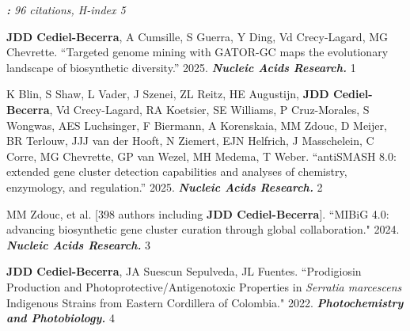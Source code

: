 
\textit{\textbf{:} 96 citations, H-index 5}

 \vspace{-2mm}

\begin{cvpubs}

\cvpub
{\textbf{JDD Cediel-Becerra}, A Cumsille, S Guerra, Y Ding, Vd Crecy-Lagard, MG Chevrette. ``Targeted genome mining with GATOR-GC maps the evolutionary landscape of biosynthetic diversity.'' 2025. \textit{\textbf{Nucleic Acids Research.}} \textit{\textbf{}}}
{1}

\cvpub
{K Blin, S Shaw, L Vader, J Szenei, ZL Reitz, HE Augustijn, \textbf{JDD Cediel-Becerra}, Vd Crecy-Lagard, RA Koetsier, SE Williams, P Cruz-Morales, S Wongwas, AES Luchsinger, F Biermann, A Korenskaia, MM Zdouc, D Meijer, BR Terlouw, JJJ van der Hooft, N Ziemert, EJN Helfrich, J Masschelein, C Corre, MG Chevrette, GP van Wezel, MH Medema, T Weber. ``antiSMASH 8.0: extended gene cluster detection capabilities and analyses of chemistry, enzymology, and regulation.'' 2025. \textit{\textbf{Nucleic Acids Research.}} \textit{\textbf{}}}
{2}

\cvpub
{MM Zdouc, et al. [398 authors including \textbf{JDD Cediel-Becerra}]. ``MIBiG 4.0: advancing biosynthetic gene cluster curation through global collaboration." 2024. \textit{\textbf{Nucleic Acids Research.}} \textit{\textbf{}}}
{3}

\cvpub
{\textbf{JDD Cediel-Becerra}, JA Suescun Sepulveda, JL Fuentes. ``Prodigiosin Production and Photoprotective/Antigenotoxic Properties in \textit{Serratia marcescens} Indigenous Strains from Eastern Cordillera of Colombia." 2022. \textit{\textbf{Photochemistry and Photobiology.}}\textit{\textbf{}}}
{4}
\end{cvpubs}


 \vspace{-2mm}

